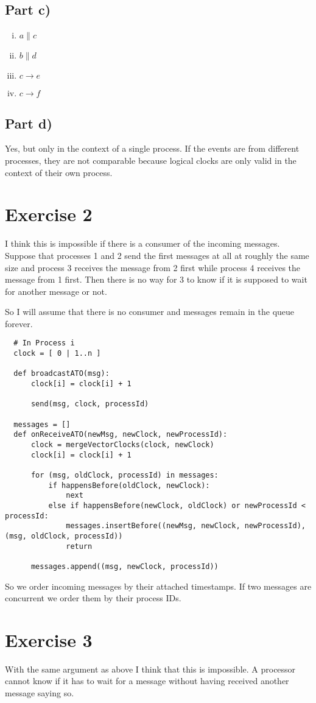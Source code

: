 \documentclass[10pt,a4paper]{article}
\begin{document}
\subsection*{Part c)}

\begin{enumerate}[i)]
\item $a \| c$
\item $b \| d$
\item $c \rightarrow e$
\item $c \rightarrow f$
\end{enumerate}

\subsection*{Part d)}

Yes, but only in the context of a single process.
If the events are from different processes, they are not comparable because logical clocks are only valid in the context of their own process.

\section*{Exercise 2}

I think this is impossible if there is a consumer of the incoming messages.
Suppose that processes 1 and 2 send the first messages at all at roughly the same size and process 3 receives the message from 2 first while process 4 receives the message from 1 first.
Then there is no way for 3 to know if it is supposed to wait for another message or not.

So I will assume that there is no consumer and messages remain in the queue forever.

\begin{verbatim}
  # In Process i
  clock = [ 0 | 1..n ]

  def broadcastATO(msg):
      clock[i] = clock[i] + 1

      send(msg, clock, processId)

  messages = []
  def onReceiveATO(newMsg, newClock, newProcessId):
      clock = mergeVectorClocks(clock, newClock)
      clock[i] = clock[i] + 1

      for (msg, oldClock, processId) in messages:
          if happensBefore(oldClock, newClock):
              next
          else if happensBefore(newClock, oldClock) or newProcessId < processId:
              messages.insertBefore((newMsg, newClock, newProcessId), (msg, oldClock, processId))
              return

      messages.append((msg, newClock, processId))
\end{verbatim}

So we order incoming messages by their attached timestamps.
If two messages are concurrent we order them by their process IDs.

\section*{Exercise 3}

With the same argument as above I think that this is impossible.
A processor cannot know if it has to wait for a message without having received another message saying so.
\end{document}
